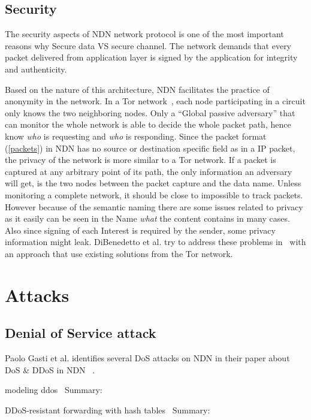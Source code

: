 \subsection{Security}
The security aspects of \gls{NDN} network protocol is one of the most important reasons why 
Secure data VS secure channel.
The network demands that every packet delivered from application layer is signed by the application for integrity and authenticity.

Based on the nature of this architecture, \gls{NDN} facilitates the practice of anonymity in the network. 
In a Tor network~\cite{DBLP:conf/uss/DingledineMS04}, each node participating in a circuit only knows the two neighboring nodes.
Only a ``Global passive adversary'' that can monitor the whole network is able to decide the whole packet path, hence know \textit{who} is requesting and \textit{who} is responding.
Since the packet format (\autoref{packets}) in \gls{NDN} has no source or destination specific field as in a \gls{IP} packet, the privacy of the network is more similar to a Tor network.
If a packet is captured at any arbitrary point of its path, the only information an adversary will get, is the two nodes between the packet capture and the data name. Unless monitoring a complete network, it should be close to impossible to track packets.  
However because of the semantic naming there are some issues related to privacy as it easily can be seen in the Name \textit{what} the content contains in many cases.
Also since signing of each Interest is required by the sender, some privacy information might leak.
DiBenedetto et al. try to address these problems in~\cite{DBLP:conf/ndss/DiBenedettoGTU12} with an approach that use existing solutions from the Tor network.

\section{Attacks}

\subsection{Denial of Service attack}
Paolo Gasti et al. identifies several \gls{DoS} attacks on \gls{NDN} in their paper about \gls{DoS} \& \gls{DDoS} in \gls{NDN} ~\cite{DBLP:conf/icccn/GastiTU013}. 


modeling ddos~\cite{DBLP:journals/ijcomsys/WangCZQZ14}
Summary:


DDoS-resistant forwarding with hash tables~\cite{DBLP:conf/ancs/SoNO13}
Summary:


